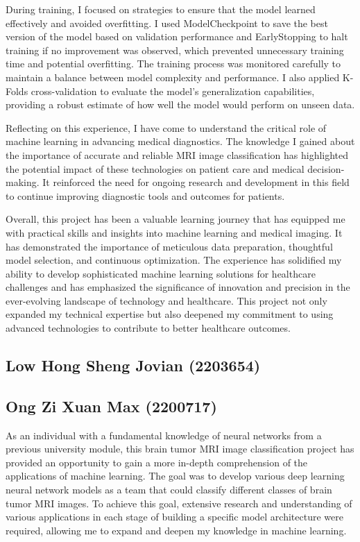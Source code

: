 During training, I focused on strategies to ensure that the model learned effectively and avoided overfitting. I used ModelCheckpoint to save the best version of the model based on validation performance and EarlyStopping to halt training if no improvement was observed, which prevented unnecessary training time and potential overfitting. The training process was monitored carefully to maintain a balance between model complexity and performance. I also applied K-Folds cross-validation to evaluate the model's generalization capabilities, providing a robust estimate of how well the model would perform on unseen data.

Reflecting on this experience, I have come to understand the critical role of machine learning in advancing medical diagnostics. The knowledge I gained about the importance of accurate and reliable MRI image classification has highlighted the potential impact of these technologies on patient care and medical decision-making. It reinforced the need for ongoing research and development in this field to continue improving diagnostic tools and outcomes for patients.

Overall, this project has been a valuable learning journey that has equipped me with practical skills and insights into machine learning and medical imaging. It has demonstrated the importance of meticulous data preparation, thoughtful model selection, and continuous optimization. The experience has solidified my ability to develop sophisticated machine learning solutions for healthcare challenges and has emphasized the significance of innovation and precision in the ever-evolving landscape of technology and healthcare. This project not only expanded my technical expertise but also deepened my commitment to using advanced technologies to contribute to better healthcare outcomes.

\subsection{Low Hong Sheng Jovian (2203654)}

\subsection{Ong Zi Xuan Max (2200717)}

As an individual with a fundamental knowledge of neural networks from a previous university module, this brain tumor MRI image classification project has provided an opportunity to gain a more in-depth comprehension of the applications of machine learning. The goal was to develop various deep learning neural network models as a team that could classify different classes of brain tumor MRI images. To achieve this goal, extensive research and understanding of various applications in each stage of building a specific model architecture were required, allowing me to expand and deepen my knowledge in machine learning.

